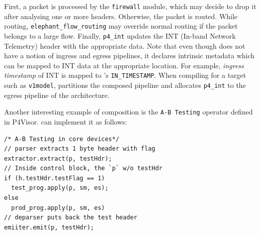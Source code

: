 \documentclass[letterpaper,twocolumn,10pt]{article}
\begin{document}
First, a packet is processed by the \texttt{firewall} module, which
may decide to drop it after analysing one or more headers. Otherwise,
the packet is routed.  While routing,
\texttt{elephant\_flow\_routing} may override normal routing if
the packet belongs to a large flow. Finally,
\texttt{p4\_int} updates the INT (In-band Network Telemetry)
\cite{Kim2015InbandNT, p4int} header with the appropriate data. Note
that even though \uarch does not have a notion of ingress and egress
pipelines, it declares intrinsic metadata which can be mapped to INT
data at the appropriate location. For example, \emph{ingress
timestamp} of INT is mapped to \ulang's \texttt{IN\_TIMESTAMP}. When
compiling for a target such as \texttt{v1model}, \ucomp partitions the
composed pipeline and allocates \texttt{p4\_int} to the egress
pipeline of the architecture.

Another interesting example of composition is the \texttt{A-B Testing}
operator defined in P4Visor\cite{Zheng:2018:PLV:3281411.3281436}.
\ulang can implement it as follows:
\begin{lstlisting}[frame=none, escapechar=!]
/* A-B Testing in core devices*/
// parser extracts 1 byte header with flag
extractor.extract(p, testHdr);
// Inside control block, the `p` w/o testHdr
if (h.testHdr.testFlag == 1)
  test_prog.apply(p, sm, es);
else
  prod_prog.apply(p, sm, es)
// deparser puts back the test header
emiiter.emit(p, testHdr);
\end{lstlisting}
\end{document}
